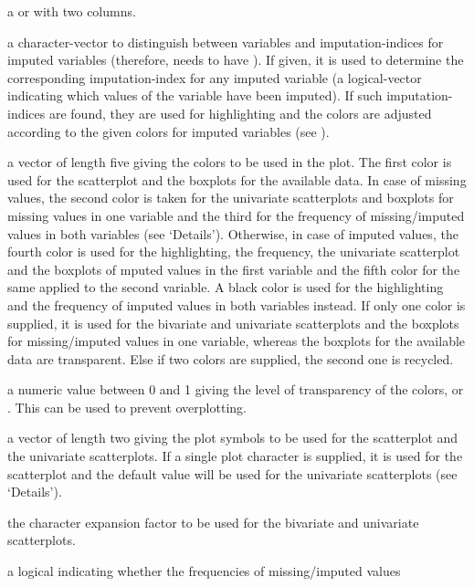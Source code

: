 \begin{Arguments}
\begin{ldescription}
\item[\code{x}] a  or  with two columns.
\item[\code{delimiter}] a character-vector to distinguish between variables
and imputation-indices for imputed variables (therefore,  needs
to have ). If given, it is used to determine the corresponding
imputation-index for any imputed variable (a logical-vector indicating
which values of the variable have been imputed). If such imputation-indices
are found, they are used for highlighting and the colors are adjusted 
according to the given colors for imputed variables (see ).
\item[\code{col}] a vector of length five giving the colors to be used in the plot.  
The first color is used for the scatterplot and the boxplots for the 
available data. In case of missing values, the second color is taken for
the univariate scatterplots and boxplots for missing values in one variable
and the third for the frequency of missing/imputed values in both variables
(see `Details'). Otherwise, in case of imputed values, the fourth
color is used for the highlighting, the frequency, the univariate
scatterplot and the boxplots of mputed values in the first variable and the
fifth color for the same applied to the second variable. A black color is
used for the highlighting and the frequency of imputed values in both
variables instead. If only one color is supplied, it is used for the
bivariate and univariate scatterplots and the boxplots for missing/imputed
values in one variable, whereas the boxplots for the available data are
transparent.  Else if two colors are supplied, the second one is recycled.
\item[\code{alpha}] a numeric value between 0 and 1 giving the level of transparency 
of the colors, or .  This can be used to prevent overplotting.
\item[\code{pch}] a vector of length two giving the plot symbols to be used for the 
scatterplot and the univariate scatterplots.  If a single plot character is 
supplied, it is used for the scatterplot and the default value will be used 
for the univariate scatterplots (see `Details').
\item[\code{cex}] the character expansion factor to be used for the bivariate and 
univariate scatterplots.
\item[\code{numbers}] a logical indicating whether the frequencies of missing/imputed values 

\end{ldescription}
\end{Arguments}
